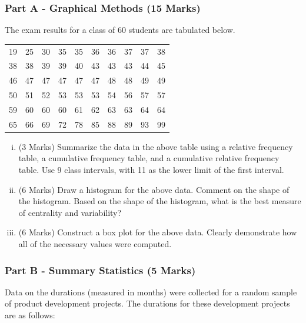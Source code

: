 \documentclass[a4paper,12pt]{article}
\begin{document}
\subsubsection*{Part A - Graphical Methods (15 Marks)} %
The exam results for a class of 60 students are tabulated below.
\begin{table}[ht]
	\centering
	\begin{tabular}{|rrrrrrrrrr|}
		\hline
	
	  19 &  25 &  30 &  35 &  35 &  36 &  36 &  37 &  37 &  38 \\ 
	  38 &  38 &  39 &  39 &  40 &  43 &  43 &  43 &  44 &  45 \\ 
		 46 &  47 &  47 &  47 &  47 &  47 &  48 &  48 &  49 &  49 \\ 
	  50 &  51 &  52 &  53 &  53 &  53 &  54 &  56 &  57 &  57 \\ 
		  59 &  60 &  60 &  60 &  61 &  62 &  63 &  63 &  64 &  64 \\ 
		  65 &  66 &  69 &  72 &  78 &  85 &  88 &  89 &  93 &  99 \\ 
		\hline
	\end{tabular}
\end{table}
\vspace{-0.5cm}
\begin{enumerate}[(i)]
	\item (3 Marks) Summarize the data in the above table using a relative frequency table, a cumulative frequency table, and a cumulative relative frequency table. Use 9 class intervals, with 11 as the lower limit of the first interval.
	\item (6 Marks) Draw a histogram for the above data. Comment on the shape of the histogram. Based on the shape of the histogram, what is the best measure of centrality and variability?
	\item (6 Marks) Construct a box plot for the above data. Clearly demonstrate how all of the necessary values were computed.
\end{enumerate}

\vspace{0.25cm}
\subsubsection*{Part B - Summary Statistics (5 Marks)} %
Data on the durations (measured in months) were collected for a random sample of product development projects. The durations for these development projects are as follows:
\end{document}
